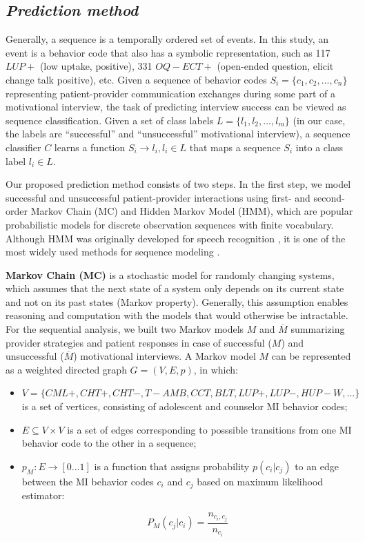 \documentclass{amia_summit_2018}
\begin{document}
\subsection*{\textit{Prediction method}}

Generally, a sequence is a temporally ordered set of events. In this study, an event is a behavior code that also has a symbolic representation, such as 117 $LUP+$ (low uptake, positive), 331 $OQ-ECT+$ (open-ended question, elicit change talk positive), etc.  Given a sequence of behavior codes $S_i = \{c_1, c_2,...,c_n\}$ representing patient-provider communication exchanges during some part of a motivational interview, the task of predicting interview success can be viewed as sequence classification. Given a set of class labels $L = \{l_1, l_2,...,l_m\}$ (in our case, the labels are ``successful'' and ``unsuccessful'' motivational interview), a sequence classifier $C$ learns a function $S_i \to l_i, l_i \in L$ that maps a sequence $S_i$ into a class label $l_i \in L$.

Our proposed prediction method consists of two steps. In the first step, we model successful and unsuccessful patient-provider interactions using first- and second-order Markov Chain (MC) and Hidden Markov Model (HMM), which are popular probabilistic models for discrete observation sequences with finite vocabulary. Although HMM was originally developed for speech recognition \cite{rabiner1989tutorial}, it is one of the most widely used methods for sequence modeling \cite{mutsam2016maximum, eickeler1998hidden, srivastava2007hmm, won2004training, chai2001folk}.

\textbf {Markov Chain (MC)} is a stochastic model for randomly changing systems, which assumes that the next state of a system only depends on its current state and not on its past states (Markov property). Generally, this assumption enables reasoning and computation with the models that would otherwise be intractable. For the sequential analysis, we built two Markov models $M$ and $\overline{M}$ summarizing provider strategies and patient responses in case of successful ($M$) and unsuccessful ($\overline{M}$) motivational interviews. A Markov model $M$ can be represented as a weighted directed graph $G = (V, E, p)$, in which:

\begin{itemize}
\item $V = \{CML+, CHT+, CHT-, T-AMB, CCT, BLT, LUP+, LUP-, HUP-W, ...\}$ is a set of vertices, consisting of adolescent and counselor MI behavior codes;
\item $E \subseteq V \times V$ is a set of edges corresponding to posssible transitions from one MI behavior code to the other in a sequence;
\item $p_M:E\rightarrow[0...1]$ is a function that assigns probability $p(c_i|c_j)$ to an edge between the MI behavior codes $c_i$ and $c_j$ based on maximum likelihood estimator:

\begin{equation}
P_M(c_j|c_i) = \frac{n_{c_i,c_j}}{n_{c_i}}
\end{equation}

\end{itemize}
\end{document}
